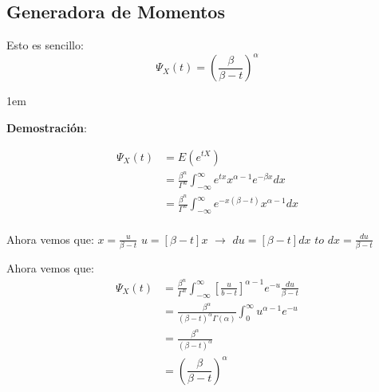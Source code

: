 \documentclass[12pt, fleqn]{report}                             %
\newenvironment{SmallIndentation}[1][0.75em]                    %
        {\begin{adjustwidth}{#1}{}\begin{footnotesize}}             %
        {\end{footnotesize}\end{adjustwidth}}                       %
\theoremstyle{break}                                            %
\newcommand{\Brackets}[1]{\left[ #1 \right]}                    %
\newcommand{\Wrap}[1]{\left( #1 \right)}                        %
\newcommand{\pfrac}[2]{\Wrap{\dfrac{#1}{#2}}}                   %
\begin{document}
            \clearpage
            \subsection{Generadora de Momentos}

                Esto es sencillo:
                \begin{equation*}
                    \Psi_X(t) = \pfrac{\beta}{\beta - t}^\alpha
                \end{equation*}

                \begin{SmallIndentation}[1em]
                    \textbf{Demostración}:
                    
                    \begin{align*}
                        \Psi_X(t)
                            &= E(e^{tX})        \\
                            &= \frac{\beta^n}{\Gamma^n} \int_{-\infty}^\infty e^{tx} x^{\alpha-1} e^{-\beta x} dx   \\
                            &= \frac{\beta^n}{\Gamma^n} \int_{-\infty}^\infty e^{-x(\beta - t)} x^{\alpha-1} dx     \\
                    \end{align*}

                    Ahora vemos que:
                    $x = \frac{u}{\beta - t}$ 
                            $u = [\beta - t]x$ $\to$ $du = [\beta - t]dx$ $to$ $dx = \frac{du}{\beta - t}$  

                    Ahora vemos que:
                    \begin{align*}
                        \Psi_X(t)
                            &= \frac{\beta^n}{\Gamma^n} \int_{-\infty}^\infty 
                                \Brackets{\frac{u}{b- t}}^{\alpha - 1} e^{-u} \frac{du}{\beta - t}                  \\
                            &= \frac{\beta^\alpha}{(\beta -t)^\alpha \Gamma(\alpha)} 
                                \int_0^\infty u^{\alpha - 1}e^{-u}                                                  \\
                            &= \frac{\beta^\alpha}{(\beta -t)^\alpha}                                               \\
                            &= \pfrac{\beta}{\beta - t}^\alpha
                    \end{align*}

                \end{SmallIndentation}
\end{document}
